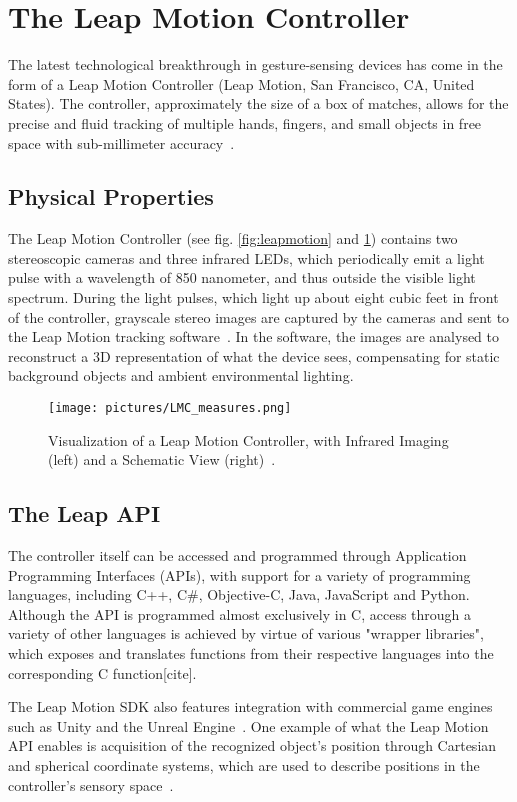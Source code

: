 \section{The Leap Motion Controller}
The latest technological breakthrough in gesture-sensing devices has come in the form of a Leap Motion Controller (Leap Motion, San Francisco, CA, United States). The controller, approximately the size of a box of matches, allows for the precise and fluid tracking of multiple hands, fingers, and small objects in free space with sub-millimeter accuracy~\citep{Guna2014}.

\subsection{Physical Properties}
The Leap Motion Controller (see fig. \ref{fig:leapmotion} and \ref{fig:leapmotion2}) contains two stereoscopic cameras and three infrared LEDs, which periodically emit a light pulse with a wavelength of 850 nanometer, and thus outside the visible light spectrum. During the light pulses, which light up about eight cubic feet in front of the controller, grayscale stereo images are captured by the cameras and sent to the Leap Motion tracking software~\citep{LeapMotion2016}. In the software, the images are analysed to reconstruct a 3D representation of what the device sees, compensating for static background objects and ambient environmental lighting. 

\begin{figure}%
	\texttt{[image: pictures/LMC\_measures.png]}
	\caption{Visualization of a Leap Motion Controller, with Infrared Imaging (left) and a Schematic View (right)~\citep{Weichert2013}.}
	\label{fig:leapmotion2}
\end{figure} 

\subsection{The Leap API}
The controller itself can be accessed and programmed through Application Programming Interfaces (APIs), with support for a variety of programming languages, including C++, C\#, Objective-C, Java, JavaScript and Python. Although the API is programmed almost exclusively in C, access through a variety of other languages is achieved by virtue of various "wrapper libraries", which exposes and translates functions from their respective languages into the corresponding C function[cite].

The Leap Motion SDK also features integration with commercial game engines such as Unity and the Unreal Engine~\citep{Guna2014}. One example of what the Leap Motion API enables is acquisition of the recognized object's position through Cartesian and spherical coordinate systems, which are used to describe positions in the controller's sensory space~\citep{Guna2014}.  

